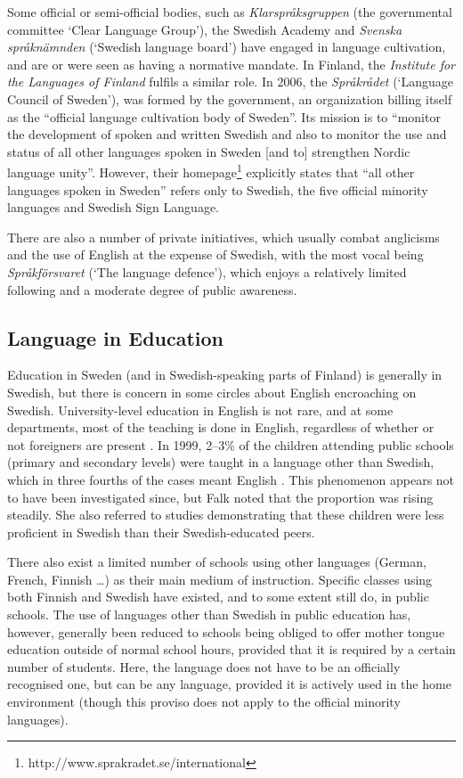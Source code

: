 \begin{multicols}{2}
Some official or semi-official bodies, such as
\textit{Klarspråksgruppen} (the governmental committee ‘Clear Language
Group’), the Swedish Academy and \textit{Svenska språknämnden}
(`Swedish language board') have engaged in language cultivation, and
are or were seen as having a normative mandate. In Finland, the
\textit{Institute for the Languages of Finland} fulfils a similar
role. In 2006, the \textit{Språkrådet} (`Language Council of Sweden'),
was formed by the government, an organization billing itself as the
``official language cultivation body of Sweden''. Its mission is to
``monitor the development of spoken and written Swedish and also to
monitor the use and status of all other languages spoken in Sweden
[and to] strengthen Nordic language unity''. However, their
homepage\footnote{http://www.sprakradet.se/international} explicitly
states that ``all other languages spoken in Sweden'' refers only to
Swedish, the five official minority languages and Swedish Sign
Language.

There are also a number of private initiatives, which usually combat
anglicisms and the use of English at the expense of Swedish, with the
most vocal being \textit{Språkförsvaret} (`The language defence'),
which enjoys a relatively limited following and a moderate degree of
public awareness.

\subsection{Language in Education}

Education in Sweden (and in Swedish-speaking parts of Finland) is
generally in Swedish, but there is concern in some circles about
English encroaching on Swedish. University-level education in English
is not rare, and at some departments, most of the teaching is done in
English, regardless of whether or not foreigners are present
\cite[25,~29f]{falk2001}. In 1999, 2--3\% of the children attending
public schools (primary and secondary levels) were taught in a
language other than Swedish, which in three fourths of the cases meant
English \cite[18f]{falk2001}. This phenomenon appears not to have been
investigated since, but Falk noted that the proportion was rising
steadily. She also referred to studies \cite[19]{falk2001}
demonstrating that these children were less proficient in Swedish than
their Swedish-educated peers.

There also exist a limited number of schools using other languages
(German, French, Finnish \ldots) as their main medium of
instruction. Specific classes using both Finnish and Swedish have
existed, and to some extent still do, in public schools. The use of
languages other than Swedish in public education has, however,
generally been reduced to schools being obliged to offer mother tongue
education outside of normal school hours, provided that it is required
by a certain number of students. Here, the language does not have to
be an officially recognised one, but can be any language, provided it
is actively used in the home environment (though this proviso does not
apply to the official minority languages).


\end{multicols}
